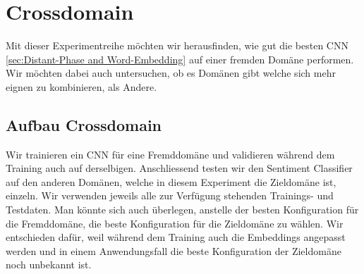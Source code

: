 \section{Crossdomain}
Mit dieser Experimentreihe möchten wir herausfinden, wie gut die besten CNN \ref{sec:Distant-Phase and Word-Embedding} auf einer fremden Domäne performen. Wir möchten dabei auch untersuchen, ob es Domänen gibt welche sich mehr eignen zu kombinieren, als Andere.
\subsection{Aufbau Crossdomain} Wir trainieren ein CNN für eine Fremddomäne und validieren während dem Training auch auf derselbigen. Anschliessend testen wir den Sentiment Classifier auf den anderen Domänen, welche in diesem Experiment die Zieldomäne ist, einzeln. Wir verwenden jeweils alle zur Verfügung stehenden Trainings- und Testdaten.
Man könnte sich auch überlegen, anstelle der besten Konfiguration für die Fremddomäne, die beste Konfiguration für die Zieldomäne zu wählen. Wir entschieden dafür, weil während dem Training auch die Embeddings angepasst werden und in einem Anwendungsfall die beste Konfiguration der Zieldomäne noch unbekannt ist.

